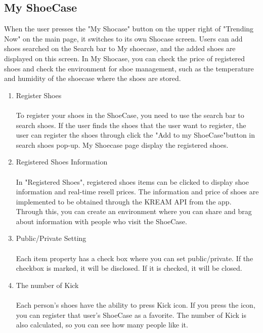 \documentclass[conference]{IEEEtran}
\begin{document}
\subsection{My ShoeCase}
When the user presses the "My Shocase" button on the upper right of "Trending Now" on the main page, it switches to its own Shocase screen. Users can add shoes searched on the Search bar to My shoecase, and the added shoes are displayed on this screen. In My Shocase, you can check the price of registered shoes and check the environment for shoe management, such as the temperature and humidity of the shoecase where the shoes are stored.\\
\begin{enumerate}
	\item Register Shoes\\\\
To register your shoes in the ShoeCase, you need to use the search bar to search shoes. If the user finds the shoes that the user want to register, the user can register the shoes through click the "Add to my ShoeCase"button in search shoes pop-up. My Shoecase page display the registered shoes.\\
	
	\item Registered Shoes Information\\
\\In "Registered Shoes", registered shoes items can be clicked to display shoe information and real-time resell prices. 
The information and price of shoes are implemented to be obtained through the KREAM API from the app. 
Through this, you can create an environment where you can share and brag about information with people who visit the ShoeCase.\\
	\item Public/Private Setting\\
\\Each item property has a check box where you can set public/private. 
If the checkbox is marked, it will be disclosed. If it is checked, it will be closed.\\
	\item The number of Kick\\
\\Each person's shoes have the ability to press Kick icon. 
If you press the icon, you can register that user's ShoeCase as a favorite.
The number of Kick is also calculated, so you can see how many people like it.\\
\end{enumerate}
\end{document}

